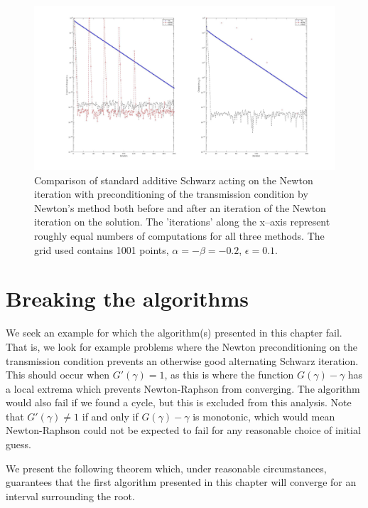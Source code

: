 \documentclass{book}
\begin{document}
\begin{figure}
	\includegraphics[width=\textwidth]{exp7_01.jpg}
	\caption{Comparison of standard additive Schwarz acting on the Newton iteration with preconditioning of the transmission condition by Newton's method both before and after an iteration of the Newton iteration on the solution. The 'iterations' along the x--axis represent roughly equal numbers of computations for all three methods. The grid used contains 1001 points, $\alpha = -\beta = -0.2$, $\epsilon = 0.1$.}
	\label{fig:ASPN}
\end{figure}

\section{Breaking the algorithms}

We seek an example for which the algorithm(s) presented in this chapter fail.
That is, we look for example problems where the Newton preconditioning on the transmission condition prevents an otherwise good alternating Schwarz iteration.
This should occur when $G'(\gamma)=1$, as this is where the function $G(\gamma)-\gamma$ has a local extrema which prevents Newton-Raphson from converging.
The algorithm would also fail if we found a cycle, but this is excluded from this analysis.
Note that $G'(\gamma) \neq 1$ if and only if $G(\gamma) - \gamma$ is monotonic, which would mean Newton-Raphson could not be expected to fail for any reasonable choice of initial guess.

We present the following theorem which, under reasonable circumstances, guarantees that the first algorithm presented in this chapter will converge for an interval surrounding the root.
\end{document}
